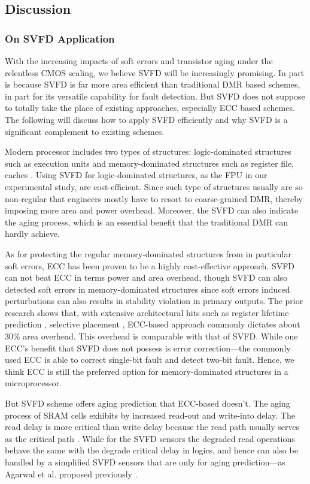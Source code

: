 \subsection{Discussion}
\subsubsection{On SVFD Application}
With the increasing impacts of soft errors and transistor aging under the relentless CMOS scaling, we believe SVFD will be increasingly promising. In part is because SVFD is far more area efficient than traditional DMR based schemes, in part for its versatile capability for fault detection. But SVFD does not suppose to totally take the place of existing approaches, especially ECC based schemes.  The following will discuss how to apply SVFD efficiently and why SVFD is a significant complement to existing schemes.

Modern processor includes two types of structures: logic-dominated structures such as execution units and memory-dominated structures such as register file, caches \cite{Revival_08}. Using  SVFD for logic-dominated structures, as the FPU in our experimental study, are cost-efficient. Since such type of structures usually are so non-regular that engineers mostly have to resort to coarse-grained DMR, thereby imposing more area and power overhead. Moreover, the SVFD can also indicate the aging process, which is an essential benefit that the traditional DMR can hardly achieve.

As for protecting the regular memory-dominated structures from in particular soft errors, ECC has been proven to be a highly cost-effective approach. SVFD can not beat ECC in terms power and area overhead, though SVFD can also detected soft errors in memory-dominated structures since soft errors induced perturbations can also results in stability violation in primary outputs. The prior research shows that, with extensive architectural hits such as register lifetime prediction \cite{Using_Register_Lifetime_dsn07}, selective placement \cite{Exploiting_selective_placement_taco08}, ECC-based approach commonly dictates about 30\% area overhead. This overhead is comparable with that of SVFD. While one ECC's benefit that SVFD does not possess is error correction---the commonly used ECC is able to correct single-bit fault and detect two-bit fault. Hence, we think ECC is still the preferred option for memory-dominated structures in a microprocessor.

But SVFD scheme offers aging prediction that ECC-based doesn't. The aging process of SRAM cells exhibits by increased read-out and write-into delay. The read delay is more critical than write delay because the read path usually serves as the critical path \cite{Mitigating_Parameter_Variation_micro07}. While for the SVFD sensors the degraded read operations behave the same with the degrade critical delay in logics, and hence can also be handled by a simplified SVFD sensors that are only for aging prediction---as Agarwal et al. proposed previously \cite{agarwal2007circuit}.

